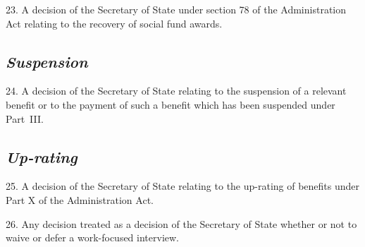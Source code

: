 \documentclass[12pt,a4paper]{article}
\begin{document}
23.  A decision of the Secretary of State under section 78 of the Administration Act relating to the recovery of social fund awards.

\subsection*{\itshape Suspension}

24.  A decision of the Secretary of State relating to the suspension of a relevant benefit or to the payment of such a benefit which has been suspended under Part~III.

\subsection*{\itshape Up-rating}

25.  A decision of the Secretary of State relating to the up-rating of benefits under Part X of the Administration Act.

\medskip

26.  Any decision treated as a decision of the Secretary of State whether or not to waive or defer a work-focused interview.


%
%
%

\end{document}
